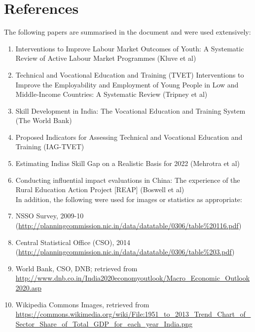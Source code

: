 \documentclass[a4paper, 10pt]{article}
\begin{document}
\section*{References}

The following papers are summarised in the document and were used extensively:

\begin{enumerate}

\item Interventions to Improve Labour Market Outcomes of Youth: A Systematic Review of Active Labour Market Programmes (Kluve et al)

\item Technical and Vocational Education and Training (TVET) Interventions to Improve the Employability and Employment of Young People in Low and Middle-Income Countries: A Systematic Review (Tripney et al)

\item Skill Development in India: The Vocational Education and Training System (The World Bank)

\item Proposed Indicators for Assessing Technical and Vocational Education and Training (IAG-TVET)

\item Estimating India\textsc{}s Skill Gap on a Realistic Basis for 2022 (Mehrotra et al)

\item Conducting influential impact evaluations in China: The experience of the Rural Education Action Project [REAP] (Boswell et al) \\

In addition, the following were used for images or statistics as appropriate: \\

\item NSSO Survey, 2009-10 (\url{http://planningcommission.nic.in/data/datatable/0306/table\%20116.pdf})

\item Central Statistical Office (CSO), 2014 (\url{http://planningcommission.nic.in/data/datatable/0306/table\%203.pdf})

\item World Bank, CSO, DNB; retrieved from \url{http://www.dnb.co.in/India2020economyoutlook/Macro_Economic_Outlook2020.asp}

\item Wikipedia Commons Images, retrieved from  \url{https://commons.wikimedia.org/wiki/File:1951_to_2013_Trend_Chart_of_Sector_Share_of_Total_GDP_for_each_year_India.png}


\end{enumerate}
\end{document}
